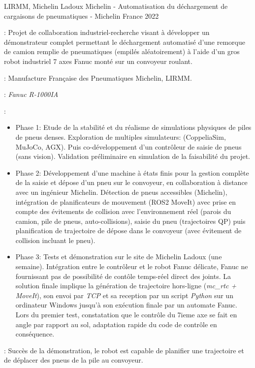 \begin{cventries}
  \cventry
  {LIRMM, Michelin Ladoux} %
  {Michelin - Automatisation du déchargement de cargaisons de pneumatiques ‑ Michelin} %
  {France} %
  {2022} %
  {
    \begin{cvitems}
    \item {} : Projet de collaboration industriel-recherche visant à développer
      un démonstrateur complet permettant le déchargement automatisé d'une remorque de camion remplie de
      pneumatiques (empilés aléatoirement) à l'aide d'un gros robot industriel 7 axes Fanuc monté sur un
      convoyeur roulant.
    \item {} : Manufacture Française des Pneumatiques Michelin, LIRMM.
    \item {} : \emph{Fanuc R-1000IA}
    \item {} :
      \begin{itemize}
        \item Phase 1: Etude de la stabilité et du réalisme de simulations physiques de piles de pneus
          denses. Exploration de multiples simulateurs: (CoppeliaSim, MuJoCo, AGX). Puis co-développement
          d'un contrôleur de saisie de pneus (sans vision). Validation préliminaire en simulation de la
          faisabilité du projet.
        \item Phase 2: Développement d'une machine à états finis pour la gestion complète de la saisie et
          dépose d'un pneu sur le convoyeur, en collaboration à distance avec un ingénieur Michelin.
          Détection de pneus accessibles (Michelin), intégration de planificateurs de mouvement (ROS2 MoveIt)
          avec prise en compte des évitements de collision avec l'environnement réel (parois du camion, pile
          de pneus, auto-collisions), saisie du pneu (trajectoires QP) puis planification de trajectoire de
          dépose dans le convoyeur (avec évitement de collision incluant le pneu).
        \item Phase 3: Tests et démonstration sur le site de Michelin Ladoux (une semaine). Intégration entre
          le contrôleur et le robot Fanuc délicate, Fanuc ne fournissant pas de possibilité de contôle
          temps-réel direct des joints. La solution finale implique la génération de trajectoire hors-ligne
          (\emph{mc\_rtc + MoveIt}), son envoi par \emph{TCP} et sa reception par un script \emph{Python} sur
          un ordinateur Windows jusqu'à son exécution finale par un automate Fanuc. Lors du premier test,
          constatation que le contrôle du 7ieme axe se fait en angle par rapport au sol, adaptation rapide du
          code de contrôle en conséquence.
      \end{itemize}
    \item {} : Succès de la démonstration, le robot est capable de planifier une
      trajectoire et de déplacer des pneus de la pile au convoyeur.
    \end{cvitems}
  }


\end{cventries}
